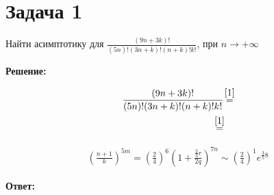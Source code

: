 
\section{Задача 1}

Найти асимптотику для $\frac{(9n+3k)!}{(5n)!(3n + k)!(n+k)!k!}$, при $n \rightarrow +\infty$

\textbf{Решение:}

\begin{equation}
\begin{aligned}
    \frac{
        (9n+3k)!
    }{
        (5n)!(3n + k)!(n+k)!k!
    }
&\myeq{1}
\\
\myeq{1}
\end{aligned}
\end{equation}


\begin{equation}
\begin{aligned}
    \left(
        \frac{
            n+1
        }{
            k
        }
    \right)
    ^{5m}
=
    \left(
        \frac{2}{4}
    \right)^{6}
    \left(
        1+
        \frac{
            \frac{2}{3}r
        }{2q}
    \right)^{7n}
\sim
    \left(
        \frac{2}{4}
    \right)^{1}
    e^{
        \frac{3}{5}8
    }
\end{aligned}
\end{equation}

\textbf{Ответ:}
